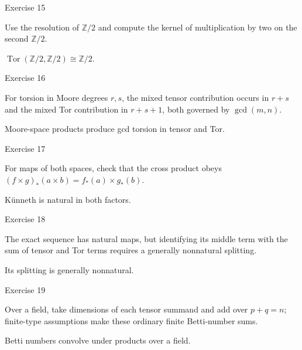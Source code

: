 \begin{exercise}\label{exr:viii27-15}
Exercise 15
\end{exercise}
\begin{hint}
Use the resolution of \(\mathbb Z/2\) and compute the kernel of multiplication by two on the second \(\mathbb Z/2\).
\end{hint}
\begin{solution}
\(\operatorname{Tor}(\mathbb Z/2,\mathbb Z/2)\cong\mathbb Z/2\).
\end{solution}

\begin{exercise}\label{exr:viii27-16}
Exercise 16
\end{exercise}
\begin{hint}
For torsion in Moore degrees \(r,s\), the mixed tensor contribution occurs in \(r+s\) and the mixed Tor contribution in \(r+s+1\), both governed by \(\gcd(m,n)\).
\end{hint}
\begin{solution}
Moore-space products produce gcd torsion in tensor and Tor.
\end{solution}

\begin{exercise}\label{exr:viii27-17}
Exercise 17
\end{exercise}
\begin{hint}
For maps of both spaces, check that the cross product obeys \((f\times g)_*(a\times b)=f_*(a)\times g_*(b)\).
\end{hint}
\begin{solution}
Künneth is natural in both factors.
\end{solution}

\begin{exercise}\label{exr:viii27-18}
Exercise 18
\end{exercise}
\begin{hint}
The exact sequence has natural maps, but identifying its middle term with the sum of tensor and Tor terms requires a generally nonnatural splitting.
\end{hint}
\begin{solution}
Its splitting is generally nonnatural.
\end{solution}

\begin{exercise}\label{exr:viii27-19}
Exercise 19
\end{exercise}
\begin{hint}
Over a field, take dimensions of each tensor summand and add over \(p+q=n\); finite-type assumptions make these ordinary finite Betti-number sums.
\end{hint}
\begin{solution}
Betti numbers convolve under products over a field.
\end{solution}

